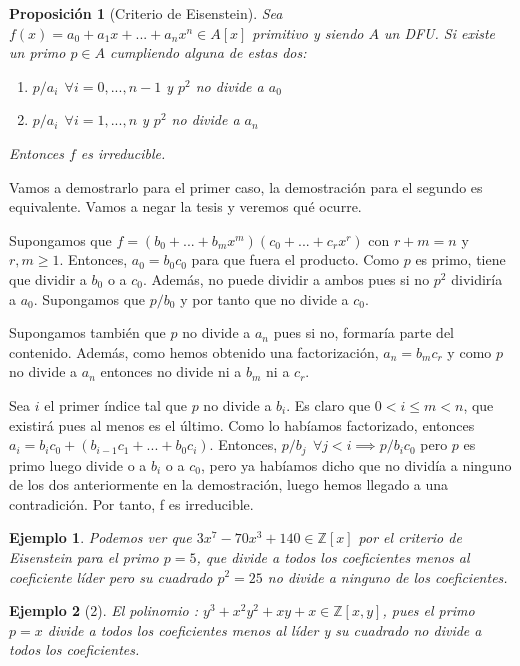 \documentclass[11pt, a4paper, titlepage]{article}
\makeatletter
\renewenvironment{proof}[1][\proofname] {\vspace{-15pt}\par\pushQED{\qed}\normalfont\topsep6\p@\@plus6\p@\relax\trivlist\item[\hskip\labelsep\it#1\@addpunct{.}]\ignorespaces}{\popQED\endtrivlist\@endpefalse}
\providecommand{\ent}{\mathbb{Z}}
\theoremstyle{theorem-style}
\newtheorem*{nprop}{Proposición}
\theoremstyle{definition-style}
\theoremstyle{remark-style}
\theoremstyle{example-style}
\newtheorem*{ejemplo}{Ejemplo}
\makeatother
\begin{document}
\begin{nprop}[Criterio de Eisenstein]
	Sea $f(x)=a_0+a_1x+...+a_nx^n \in A[x]$ primitivo y siendo $A$ un DFU.
Si existe un primo $p\in A$ cumpliendo alguna de estas dos:
	\begin{enumerate}
	\item $p/a_i \ \ \forall i = 0,...,n-1$ y $p^2$ no divide a $a_0$ 
	\item $p/a_i \ \ \forall i=1,...,n$ y $p^2$ no divide a $a_n$
\end{enumerate}
Entonces $f$ es irreducible.

\end{nprop}
\begin{proof}
	Vamos a demostrarlo para el primer caso, la demostración para el segundo es equivalente. Vamos a negar la tesis y veremos qué ocurre.
	
	Supongamos que $f=(b_0+...+b_mx^m)(c_0+...+c_rx^r)$ con $r+m=n$ y $r,m \geq 1$. Entonces, $a_0=b_0c_0$ para que fuera el producto. Como $p$ es primo, tiene que dividir a $b_0$ o a $c_0$. Además, no puede dividir a ambos pues si no $p^2$ dividiría a $a_0$. Supongamos que $p/b_0$ y por tanto que no divide a $c_0$. 
	
	Supongamos también que $p$ no divide a $a_n$ pues si no, formaría parte del contenido. Además, como hemos obtenido una factorización, $a_n = b_mc_r$ y como $p$ no divide a $a_n$ entonces no divide ni a $b_m$ ni a $c_r$.
	
	Sea $i$ el primer índice tal que $p$ no divide a $b_i$. Es claro que $0<i \leq m < n$, que existirá pues al menos es el último. Como lo habíamos factorizado, entonces $a_i = b_ic_0+(b_{i-1}c_1+...+b_0c_i)$. Entonces, $p/b_j \ \ \forall j < i \implies p/b_ic_0$ pero $p$ es primo luego divide o a $b_i$ o a $c_0$, pero ya habíamos dicho que no dividía a ninguno de los dos anteriormente en la demostración, luego hemos llegado a una contradición. Por tanto, f es irreducible.
\end{proof}

\begin{ejemplo}
	Podemos ver que $3x^7-70x^3+140 \in \ent[x]$ por el criterio de Eisenstein para el primo $p=5$, que divide a todos los coeficientes menos al coeficiente líder pero su cuadrado $p^2 = 25$ no divide a ninguno de los coeficientes. 
\end{ejemplo}
\begin{ejemplo}[2]
	El polinomio : $y^3 + x^2y^2 +xy + x \in \ent[x,y]$, pues el primo $p=x$ divide a todos los coeficientes menos al líder y su cuadrado no divide a todos los coeficientes.
\end{ejemplo}
\end{document}
